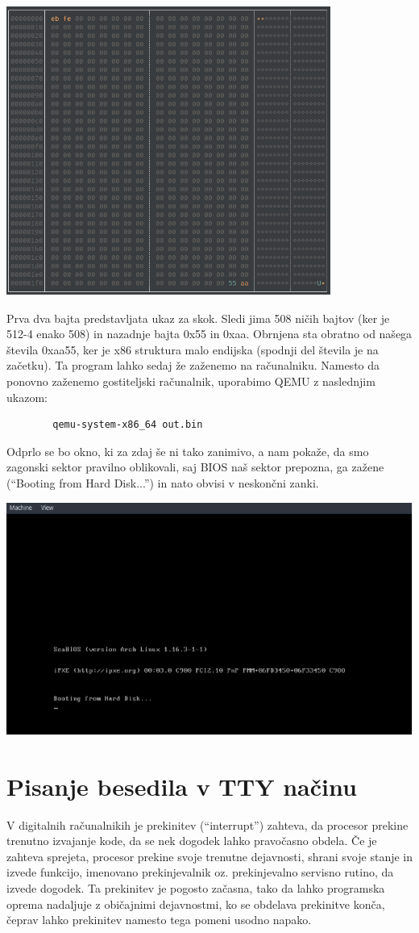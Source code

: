 \documentclass{report}
\begin{document}
\includegraphics[scale=0.5]{bytes_raw}

Prva dva bajta predstavljata ukaz za skok. Sledi jima 508 ničih bajtov (ker je
512-4 enako 508) in nazadnje bajta 0x55 in 0xaa. Obrnjena sta obratno od našega števila 0xaa55, ker je x86 struktura malo endijska (spodnji del števila je na začetku). Ta program lahko sedaj že zaženemo na računalniku. Namesto da ponovno zaženemo gostiteljski računalnik, uporabimo QEMU z naslednjim ukazom:
    \begin{verbatim}
        qemu-system-x86_64 out.bin
    \end{verbatim}
Odprlo se bo okno, ki za zdaj še ni tako zanimivo, a nam pokaže, da smo zagonski
sektor pravilno oblikovali, saj BIOS naš sektor prepozna, ga zažene (``Booting
from Hard Disk...'') in nato obvisi v neskončni zanki.

\includegraphics[scale=0.5]{boot1}

\section{Pisanje besedila v TTY načinu}
V digitalnih računalnikih je prekinitev (``interrupt'') zahteva, da procesor prekine trenutno izvajanje kode, da se nek dogodek lahko pravočasno obdela. Če je zahteva sprejeta, procesor prekine svoje trenutne dejavnosti, shrani svoje stanje in izvede funkcijo, imenovano prekinjevalnik oz. prekinjevalno servisno rutino, da izvede dogodek. Ta prekinitev je pogosto začasna, tako da lahko programska oprema nadaljuje z običajnimi dejavnostmi, ko se obdelava prekinitve konča, čeprav lahko prekinitev namesto tega pomeni usodno napako.
\end{document}
